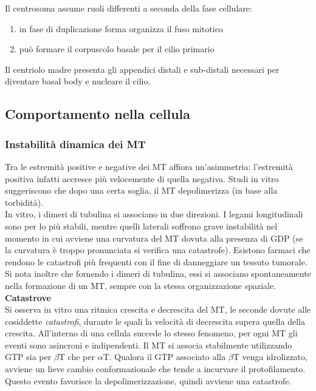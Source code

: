                 Il centrosoma assume ruoli differenti a seconda della fase cellulare:
                \begin{enumerate}
                    \item in fase di duplicazione forma organizza il fuso mitotico
                    \item può formare il corpuscolo basale per il cilio primario
                \end{enumerate}
                Il centriolo madre presenta gli appendici distali e sub-distali necessari per diventare basal body e nucleare il cilio.
        
    \subsection{Comportamento nella cellula}
        \subsubsection{Instabilità dinamica dei MT}
            Tra le estremità positive e negative dei MT affiora un'asimmetria: l'estremità positiva infatti accresce più velocemente di quella negativa. Studi in vitro suggeriscono che dopo una certa soglia, il MT depolimerizza (in base alla torbidità).\\
            In vitro, i dimeri di tubulina si associano in due direzioni. I legami longitudinali sono per lo più stabili, mentre quelli laterali soffrono grave instabilità nel momento in cui avviene una curvatura del MT dovuta alla presenza di GDP (se la curvatura è troppo pronunciata si verifica una catastrofe). Esistono farmaci che rendono le catastrofi più frequenti con il fine di danneggiare un tessuto tumorale.\\
            Si nota inoltre che fornendo i dimeri di tubulina, essi si associano spontaneamente nella formazione di un MT, sempre con la stessa organizzazione spaziale.\\
            
            \textbf{Catastrove}\\
                Si osserva in vitro una ritmica crescita e decrescita del MT, le seconde dovute alle cosiddette \textit{catastrofi}, durante le quali la velocità di decrescita supera quella della crescita.
                All'interno di una cellula succede lo stesso fenomeno, per ogni MT gli eventi sono asincroni e indipendenti.
                Il MT si associa stabilmente utilizzando GTP sia per $\beta$T che per $\alpha$T. Qualora il GTP associato alla $\beta$T venga idrolizzato, avviene un lieve cambio conformazionale che tende a incurvare il protofilamento. Questo evento favorisce la depolimerizzazione, quindi avviene una catastrofe.\\
                
